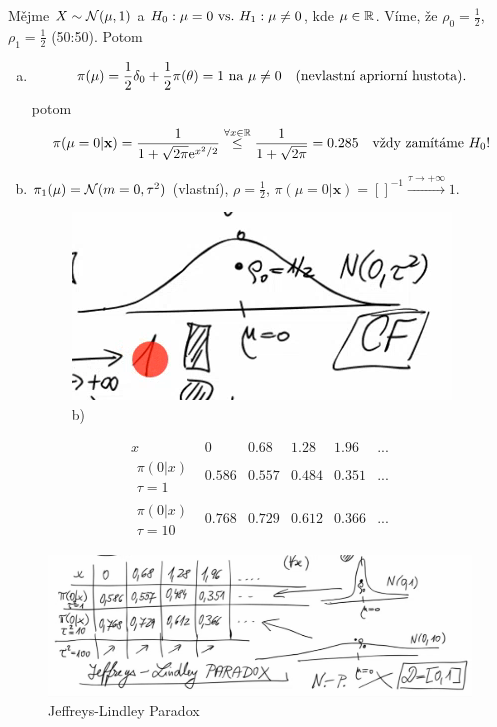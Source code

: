 \begin{example}
	Mějme $X\sim\mathcal{N}(\mu,1)$ a $H_0: \mu=0 ~\text{vs.}~ H_1: \mu\neq0$, kde $\mu\in\mathbb{R}$. Víme, že $\rho_0=\frac{1}{2}$, $\rho_1=\frac{1}{2}$ (50:50). Potom
	\begin{enumerate}[a)]
		\item $$ \pi(\mu)=\frac{1}{2}\delta_0+\frac{1}{2}\pi(\theta)=1\text{ na }\mu\neq0\quad(\text{nevlastní apriorní hustota}).$$
		potom $$ \pi(\mu=0|\textbf{x})=\frac{1}{1+\sqrt{2\pi} \mathrm{e}^{x^2/2}}\stackrel{\forall x\in\mathbb{R}}{\leq}\frac{1}{1+\sqrt{2\pi}}=0.285\quad \text{vždy zamítáme }H_0!$$
		\item $\pi_1(\mu)=\mathcal{N}(m=0,\tau^2)$ (vlastní), $\rho=\frac{1}{2}$, $\pi(\mu=0|\textbf{x})=[]^{-1}\stackrel{\tau\to+\infty}{\longrightarrow}1.$
		\begin{figure}[h]
			\centering
			\includegraphics[width=0.5\linewidth]{pictures/last01}
			\caption{b)}
			\label{fig:last01}
		\end{figure}
		
	\end{enumerate}
$$ \begin{array}{c|c|c|c|c|c}
x & 0 & 0.68 & 1.28 & 1.96 & ... \\\hline
\substack{\pi(0|x)\\ \tau=1}& 0.586 & 0.557 & 0.484 & 0.351 & ... \\\hline
\substack{\pi(0|x)\\ \tau=10}& 0.768 & 0.729 & 0.612 & 0.366 & ...
\end{array}
 $$
\end{example}
\begin{figure}[h]
	\centering
	\includegraphics[width=0.8\linewidth]{pictures/last02}
	\caption{Jeffreys-Lindley Paradox}
	\label{fig:last02}
\end{figure}
